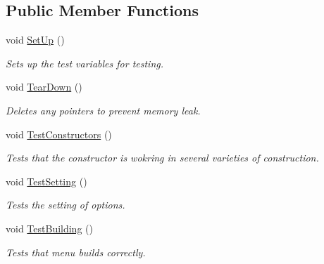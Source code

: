 \subsection*{Public Member Functions}
\begin{DoxyCompactItemize}
\item 
void \hyperlink{classMenuTest_afe356a4dfec90fec48cdfb5a31292dda}{Set\-Up} ()
\begin{DoxyCompactList}\small\item\em Sets up the test variables for testing. \end{DoxyCompactList}\item 
\hypertarget{classMenuTest_abd39213e0c7d442794d552460d920865}{void \hyperlink{classMenuTest_abd39213e0c7d442794d552460d920865}{Tear\-Down} ()}\label{classMenuTest_abd39213e0c7d442794d552460d920865}

\begin{DoxyCompactList}\small\item\em Deletes any pointers to prevent memory leak. \end{DoxyCompactList}\item 
\hypertarget{classMenuTest_a8937223971935c31487f46a00d294e97}{void \hyperlink{classMenuTest_a8937223971935c31487f46a00d294e97}{Test\-Constructors} ()}\label{classMenuTest_a8937223971935c31487f46a00d294e97}

\begin{DoxyCompactList}\small\item\em Tests that the constructor is wokring in several varieties of construction. \end{DoxyCompactList}\item 
\hypertarget{classMenuTest_ab0a87d1e4ee856ccf3af3cc6663845c4}{void \hyperlink{classMenuTest_ab0a87d1e4ee856ccf3af3cc6663845c4}{Test\-Setting} ()}\label{classMenuTest_ab0a87d1e4ee856ccf3af3cc6663845c4}

\begin{DoxyCompactList}\small\item\em Tests the setting of options. \end{DoxyCompactList}\item 
\hypertarget{classMenuTest_af74ddfe672fb68438b3e966c3736a763}{void \hyperlink{classMenuTest_af74ddfe672fb68438b3e966c3736a763}{Test\-Building} ()}\label{classMenuTest_af74ddfe672fb68438b3e966c3736a763}

\begin{DoxyCompactList}\small\item\em Tests that menu builds correctly. \end{DoxyCompactList}\end{DoxyCompactItemize}


